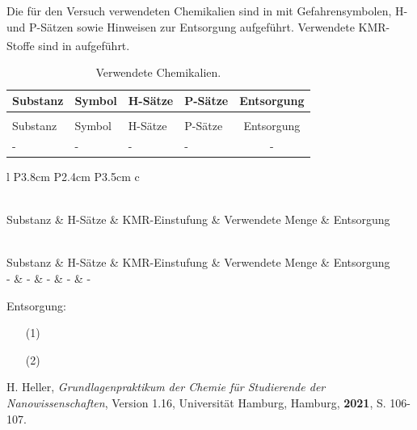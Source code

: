 \documentclass[
	a4paper,										%
	12pt,											%
	twoside,										%
	headsepline,								%
	footsepline,									%
	captions=tableheading,					%
]{scrartcl}
\newcommand{\zitat}[1]{\textsuperscript{\cite{#1}}}
\newcommand{\langetabelle}[6]{  %
	\begin{centering}           %
		{\begin{longtable}[#3]{#4}
				\caption{#2\label{tab: #1}}\\				
				\hline
				#5
				\hline
				\endfirsthead
                \caption{#2\label{tab: #1}}\\
				\hline
				#5
				\hline
				\endhead
				#6												
				\hline 
		\end{longtable}}
\end{centering}}
\begin{document}
Die für den Versuch verwendeten Chemikalien sind in  mit Gefahrensymbolen, H- und P-Sätzen sowie Hinweisen zur Entsorgung aufgeführt. Verwendete KMR-Stoffe sind in  aufgeführt.\zitat{entsorgung1}
	
\langetabelle
	{entsorgung1}
	{Verwendete Chemikalien.}
	{H}  %
	{l p{1.4cm} p{2.2cm} p{4.5cm} c}
	{Substanz & Symbol & H-Sätze & P-Sätze & Entsorgung \\}
	{ - & - & - & - & - \\}

\langetabelle
	{KMR1}
	{Verwendete kanzerogene, mutagene oder reproduktionstoxische Gefahrstoffe (KMR).}
	{H}
	{l P{3.8cm} P{2.4cm} P{3.5cm} c}
	{Substanz & H-Sätze & KMR-Einstufung & Verwendete Menge & Entsorgung \\}
	{ - & - & - & - & - \\}
	
Entsorgung: \\
\begin{itemize}
    \item[(1)] 
    \item[(2)] 
\end{itemize}	

\newpage

\begin{thebibliography}{4}		%

						{H. Heller}, 
			\textit	{Grundlagenpraktikum der Chemie für Studierende der Nanowissenschaften}, 
						{Version 1.16}, 
						{Universität Hamburg}, 
						{Hamburg}, 
			\textbf	{2021}, 
			S.			{106-107}.
			
\end{thebibliography}
\end{document}
